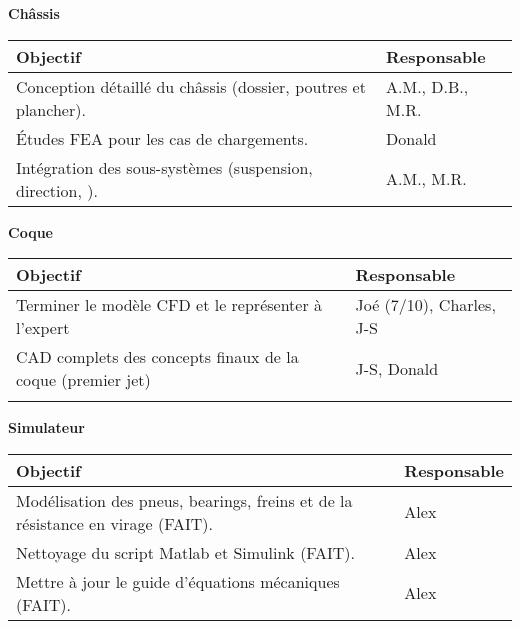 \textbf{\large Ch\^assis}\\
\begin{tabularx}{\linewidth}{
    |>{\hsize=1.75\hsize}X|%
    >{\hsize=0.25\hsize}X|%
  }
    \hline
    \textbf{Objectif} & \textbf{Responsable} \\\hline
       Conception détaillé du ch\^assis (dossier, poutres et plancher). & A.M., D.B., M.R.\\\hline 
       Études FEA pour les cas de chargements. & Donald\\\hline
       Intégration des sous-systèmes (suspension, direction, ). & A.M., M.R. \\\hline 
\end{tabularx}



\hfill \break
\textbf{\large Coque}\\
\begin{tabularx}{\linewidth}{
    |>{\hsize=1.75\hsize}X|%
    >{\hsize=0.25\hsize}X|%
  }
    \hline
    \textbf{Objectif} & \textbf{Responsable} \\\hline
       Terminer le modèle CFD et le représenter à l'expert & Joé (7/10), Charles, J-S \\\hline
       CAD complets des concepts finaux de la coque (premier jet) & J-S, Donald \\\hline
       & \\\hline 
\end{tabularx}



\hfill \break
\textbf{\large Simulateur}\\
\begin{tabularx}{\linewidth}{
    |>{\hsize=1.75\hsize}X|%
    >{\hsize=0.25\hsize}X|%
  }
    \hline
    \textbf{Objectif} & \textbf{Responsable} \\\hline
       Modélisation des pneus, bearings, freins et de la résistance en virage (FAIT).&Alex \\\hline 
       Nettoyage du script Matlab et Simulink (FAIT).&Alex \\\hline
       Mettre à jour le guide d'équations mécaniques (FAIT).&Alex \\\hline 
\end{tabularx}



